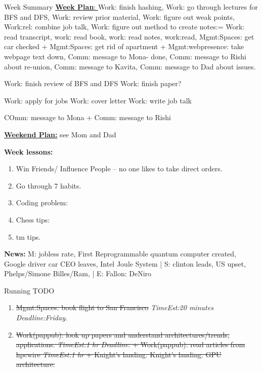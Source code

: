 \documentclass[serif, mathserif, final]{beamer}
\newcommand{\doneTask}[1]{\tiny \item \tiny \sout{#1}}
\newcommand{\te}[1]{\textit{TimeEst:}\textit{#1}}
\newcommand{\dl}[1]{\textit{Deadline:}\textit{#1}}
\begin{document}
\begin{frame}
\begin{columns}
\begin{column}{0.5\linewidth}
\begin{block}{Week Summary}
        {\tiny \underline{\textbf{Week Plan}: } \tiny Work: finish hashing, Work: go
        through lectures for BFS and DFS, Work: review prior material, Work:
        figure out weak points, Work:rel: combine job talk, Work: figure out
        method to create notes:= Work: read transcript, work: read book, work:
        read notes, work:read,  Mgmt:Spaces: get car checked + Mgmt:Spaces:
        get rid of apartment + Mgmt:webpresence: take webpage text down, Comm:
        message to Mona- done, Comm: message to Rishi about re-union, Comm:
        message to Kavita, Comm: message to Dad about issues.}



Work: finish review of BFS and DFS 
Work: finish paper? 

Work: apply for jobs 
Work: cover letter
Work: write job talk  

COmm: message to Mona + Comm: message to Rishi 


        {\tiny \underline{\textbf{Weekend Plan:}} see Mom and Dad}

        {\tiny {\bf Week lessons:}}
        \begin{enumerate}
          \tiny \item \tiny Win Friends/ Influence People – no one
          likes to take direct orders.
        \item \tiny Go through 7 habits.
        \item \tiny Coding problem: 
        \item \tiny Chess tips: 
        \item \tiny tm tips.
        \end{enumerate} 

        {{\tiny \bf News:} M: jobless rate, First Reprogrammable
          quantum computer created, Google driver car CEO leaves,
          Intel Joule System | S: clinton leads, US upset, Phelps/Simone
          Billes/Ram, | E: Fallon: DeNiro} 

      \begin{block}{Running TODO} %
        \begin{enumerate} 
          \doneTask{Mgmt:Spaces: book flight to San Francisco} \te{20
            minutes} \dl{Friday}. 

          \doneTask{Work(pappub): look up papers and understand
            architectures/trends, applications. \te{1 hr} \dl{} +
            Work(pappub): read articles from hpcwire \te{1 hr} + Knight's
            landing.  
          Knight's landing. 
          GPU architecture. 
          }


\end{enumerate}
\end{block}
\end{block}
\end{column}
\end{columns}
\end{frame}
\end{document}
